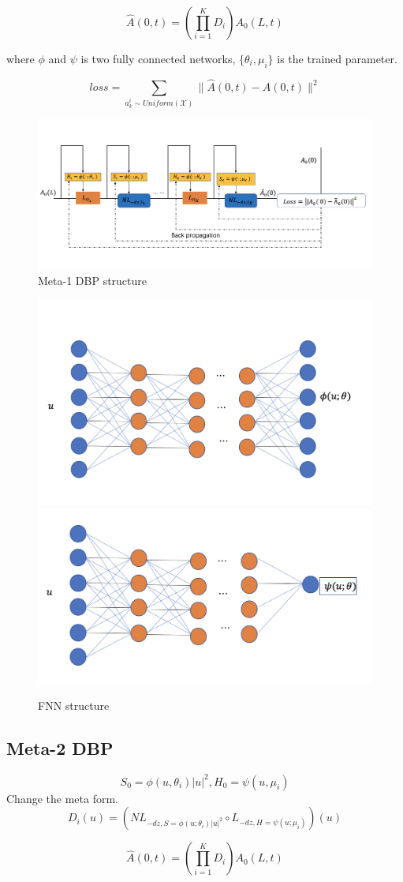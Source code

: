 $$
\hat{A}(0,t) = \left(\prod_{i=1}^{K} D_i\right)A_0(L,t)
$$

where $\phi$ and $\psi$ is two fully connected networks, $\{\theta_i,\mu_i\}$ is the trained parameter. 

$$
loss = \sum_{a_k^i \sim Uniform(\mathcal{X})} \|\hat{A}(0,t) - A(0,t)\|^2
$$
\begin{figure}[htbp]
\centering
\includegraphics[width=0.6\linewidth]{img/Meta-1.png}
\caption{Meta-1 DBP structure}
\label{Meta-1}
\end{figure}

\begin{figure}[htbp]
  \centering
  \includegraphics[width=0.4\linewidth]{img/FNNphi.png}
  \includegraphics[width=0.4\linewidth]{img/FNNpsi.png}
  \caption{FNN structure}
  \label{FNN1}
  \end{figure}

\newpage
\subsection{Meta-2 DBP}
\begin{equation}
  S_0 = \phi(u,\theta_i)|u|^2, H_0 = \psi(u,\mu_i)
  \end{equation}
Change the meta form.
$$
D_i(u) = \left(NL_{-dz,S=\phi(u;\theta_i)|u|^2} \circ L_{-dz,H=\psi(u;\mu_i)}\right) (u)
$$

$$
\hat{A}(0,t) = \left(\prod_{i=1}^{K} D_i\right)A_0(L,t)
$$

